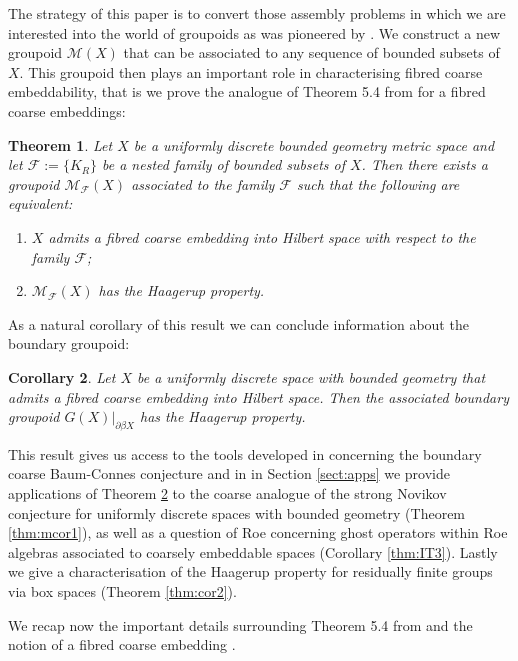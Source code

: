 \documentclass[preprint]{elsarticle}
\theoremstyle{plain}
\newtheorem{theorem}{Theorem}%
\newtheorem{corollary}[theorem]{Corollary}%
\theoremstyle{definition}%
\theoremstyle{remark}%
\begin{document}
The strategy of this paper is to convert those assembly problems in which we are interested into the world of groupoids as was pioneered by \cite{MR1905840}. We construct a new groupoid $\mathcal{M}(X)$ that can be associated to any sequence of bounded subsets of $X$. This groupoid then plays an important role in characterising fibred coarse embeddability, that is we prove the analogue of Theorem 5.4 from \cite{MR1905840} for a fibred coarse embeddings: 

\begin{theorem}\label{Thm:MR1}
Let $X$ be a uniformly discrete bounded geometry metric space and let $\mathcal{F}:=\lbrace K_{R} \rbrace$ be a nested family of bounded subsets of $X$. Then there exists a groupoid $\mathcal{M}_{\mathcal{F}}(X)$ associated to the family $\mathcal{F}$ such that the following are equivalent:
\begin{enumerate}
\item $X$ admits a fibred coarse embedding into Hilbert space with respect to the family $\mathcal{F}$;
\item$\mathcal{M}_{\mathcal{F}}(X)$ has the Haagerup property.
\end{enumerate}
\end{theorem}

As a natural corollary of this result we can conclude information about the boundary groupoid:

\begin{corollary}\label{Thm:MT1}
Let $X$ be a uniformly discrete space with bounded geometry that admits a fibred coarse embedding into Hilbert space. Then the associated boundary groupoid $G(X)|_{\partial\beta X}$ has the Haagerup property.
\end{corollary}

This result gives us access to the tools developed in \cite{mypub1} concerning the boundary coarse Baum-Connes conjecture and in in Section \ref{sect:apps} we provide applications of Theorem \ref{Thm:MT1} to the coarse analogue of the strong Novikov conjecture for uniformly discrete spaces with bounded geometry (Theorem \ref{thm:mcor1}), as well as a question of Roe concerning ghost operators within Roe algebras associated to coarsely embeddable spaces (Corollary \ref{thm:IT3}). Lastly we give a characterisation of the Haagerup property for residually finite groups via box spaces (Theorem \ref{thm:cor2}).

We recap now the important details surrounding Theorem 5.4 from \cite{MR1905840} and the notion of a fibred coarse embedding \cite{FCEpaper}.
\end{document}
